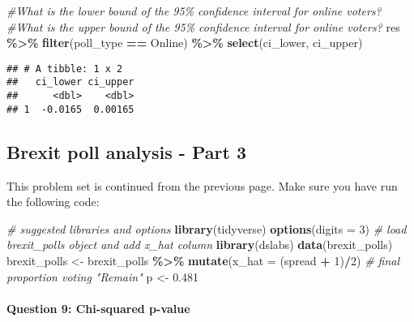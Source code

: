 \documentclass[
]{article}
\newenvironment{Shaded}{\begin{snugshade}}{\end{snugshade}}
\newcommand{\CommentTok}[1]{\textcolor[rgb]{0.56,0.35,0.01}{\textit{#1}}}
\newcommand{\DataTypeTok}[1]{\textcolor[rgb]{0.13,0.29,0.53}{#1}}
\newcommand{\DecValTok}[1]{\textcolor[rgb]{0.00,0.00,0.81}{#1}}
\newcommand{\FloatTok}[1]{\textcolor[rgb]{0.00,0.00,0.81}{#1}}
\newcommand{\KeywordTok}[1]{\textcolor[rgb]{0.13,0.29,0.53}{\textbf{#1}}}
\newcommand{\NormalTok}[1]{#1}
\newcommand{\OperatorTok}[1]{\textcolor[rgb]{0.81,0.36,0.00}{\textbf{#1}}}
\newcommand{\StringTok}[1]{\textcolor[rgb]{0.31,0.60,0.02}{#1}}
\begin{document}
\begin{Shaded}
\begin{Highlighting}[]
\CommentTok{\#What is the lower bound of the 95\% confidence interval for online voters?}
\CommentTok{\#What is the upper bound of the 95\% confidence interval for online voters?}
\NormalTok{res }\OperatorTok{\%\textgreater{}\%}
\StringTok{  }\KeywordTok{filter}\NormalTok{(poll\_type }\OperatorTok{==}\StringTok{ \textquotesingle{}Online\textquotesingle{}}\NormalTok{) }\OperatorTok{\%\textgreater{}\%}
\StringTok{  }\KeywordTok{select}\NormalTok{(ci\_lower, ci\_upper)}
\end{Highlighting}
\end{Shaded}

\begin{verbatim}
## # A tibble: 1 x 2
##   ci_lower ci_upper
##      <dbl>    <dbl>
## 1  -0.0165  0.00165
\end{verbatim}

\hypertarget{brexit-poll-analysis---part-3}{%
\subsection{Brexit poll analysis - Part
3}\label{brexit-poll-analysis---part-3}}

This problem set is continued from the previous page. Make sure you have
run the following code:

\begin{Shaded}
\begin{Highlighting}[]
\CommentTok{\# suggested libraries and options}
\KeywordTok{library}\NormalTok{(tidyverse)}
\KeywordTok{options}\NormalTok{(}\DataTypeTok{digits =} \DecValTok{3}\NormalTok{)}
\CommentTok{\# load brexit\_polls object and add x\_hat column}
\KeywordTok{library}\NormalTok{(dslabs)}
\KeywordTok{data}\NormalTok{(brexit\_polls)}
\NormalTok{brexit\_polls \textless{}{-}}\StringTok{ }\NormalTok{brexit\_polls }\OperatorTok{\%\textgreater{}\%}
\StringTok{    }\KeywordTok{mutate}\NormalTok{(}\DataTypeTok{x\_hat =}\NormalTok{ (spread }\OperatorTok{+}\StringTok{ }\DecValTok{1}\NormalTok{)}\OperatorTok{/}\DecValTok{2}\NormalTok{)}
\CommentTok{\# final proportion voting "Remain"}
\NormalTok{p \textless{}{-}}\StringTok{ }\FloatTok{0.481}
\end{Highlighting}
\end{Shaded}

\hypertarget{question-9-chi-squared-p-value}{%
\paragraph{Question 9: Chi-squared
p-value}\label{question-9-chi-squared-p-value}}
\end{document}
